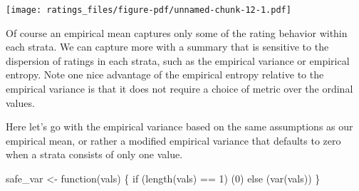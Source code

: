\documentclass[
  letterpaper,
  DIV=11,
  numbers=noendperiod]{scrartcl}
\newenvironment{Shaded}{\begin{snugshade}}{\end{snugshade}}
\newcommand{\ControlFlowTok}[1]{\textcolor[rgb]{0.00,0.23,0.31}{#1}}
\newcommand{\DecValTok}[1]{\textcolor[rgb]{0.68,0.00,0.00}{#1}}
\newcommand{\FunctionTok}[1]{\textcolor[rgb]{0.28,0.35,0.67}{#1}}
\newcommand{\NormalTok}[1]{\textcolor[rgb]{0.00,0.23,0.31}{#1}}
\newcommand{\OtherTok}[1]{\textcolor[rgb]{0.00,0.23,0.31}{#1}}
\newcommand{\SpecialCharTok}[1]{\textcolor[rgb]{0.37,0.37,0.37}{#1}}
\begin{document}
\texttt{[image: ratings\_files/figure-pdf/unnamed-chunk-12-1.pdf]}

Of course an empirical mean captures only some of the rating behavior
within each strata. We can capture more with a summary that is sensitive
to the dispersion of ratings in each strata, such as the empirical
variance or empirical entropy. Note one nice advantage of the empirical
entropy relative to the empirical variance is that it does not require a
choice of metric over the ordinal values.

Here let's go with the empirical variance based on the same assumptions
as our empirical mean, or rather a modified empirical variance that
defaults to zero when a strata consists of only one value.

\begin{Shaded}
\begin{Highlighting}[]
\NormalTok{safe\_var }\OtherTok{\textless{}{-}} \ControlFlowTok{function}\NormalTok{(vals) \{}
  \ControlFlowTok{if}\NormalTok{ (}\FunctionTok{length}\NormalTok{(vals) }\SpecialCharTok{==} \DecValTok{1}\NormalTok{)}
\NormalTok{    (}\DecValTok{0}\NormalTok{)}
  \ControlFlowTok{else}
\NormalTok{    (}\FunctionTok{var}\NormalTok{(vals))}
\NormalTok{\}}
\end{Highlighting}
\end{Shaded}
\end{document}
